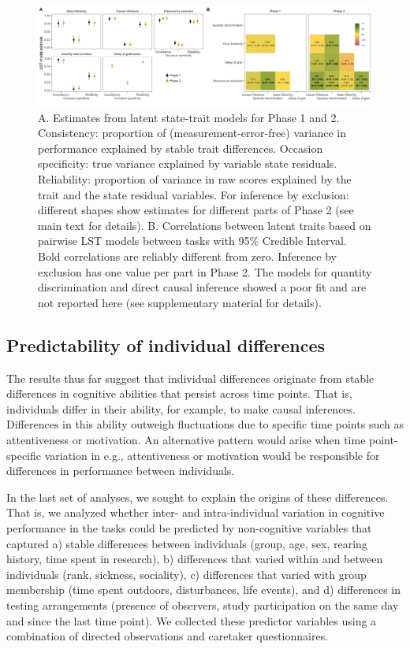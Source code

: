 \documentclass[
  man,floatsintext]{apa6}
\begin{document}
\begin{figure}
\includegraphics[width=1\linewidth]{./figures/lstm} \caption{A. Estimates from latent state-trait models for Phase 1 and 2. Consistency: proportion of (measurement-error-free) variance in performance explained by stable trait differences. Occasion specificity: true variance explained by variable state residuals. Reliability: proportion of variance in raw scores explained by the trait and the state residual variables. For inference by exclusion: different shapes show estimates for different parts of Phase 2 (see main text for details). B. Correlations between latent traits based on pairwise LST models between tasks with 95\% Credible Interval. Bold correlations are reliably different from zero. Inference by exclusion has one value per part in Phase 2. The models for quantity discrimination and direct causal inference showed a poor fit and are not reported here (see supplementary material for details).}\label{fig:lstmplot}
\end{figure}

\hypertarget{predictability-of-individual-differences}{%
\subsection{Predictability of individual differences}\label{predictability-of-individual-differences}}

The results thus far suggest that individual differences originate from stable differences in cognitive abilities that persist across time points. That is, individuals differ in their ability, for example, to make causal inferences. Differences in this ability outweigh fluctuations due to specific time points such as attentiveness or motivation. An alternative pattern would arise when time point-specific variation in e.g., attentiveness or motivation would be responsible for differences in performance between individuals.

In the last set of analyses, we sought to explain the origins of these differences. That is, we analyzed whether inter- and intra-individual variation in cognitive performance in the tasks could be predicted by non-cognitive variables that captured a) stable differences between individuals (group, age, sex, rearing history, time spent in research), b) differences that varied within and between individuals (rank, sickness, sociality), c) differences that varied with group membership (time spent outdoors, disturbances, life events), and d) differences in testing arrangements (presence of observers, study participation on the same day and since the last time point). We collected these predictor variables using a combination of directed observations and caretaker questionnaires.
\end{document}
